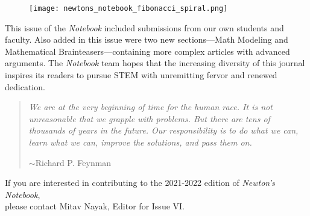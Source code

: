 \documentclass[12pt]{article}
\theoremstyle{definition}
\begin{document}
\newpage



\newpage


\begin{figure}[H]
    \centering
    \vspace*{50pt}
    \texttt{[image: newtons\_notebook\_fibonacci\_spiral.png]}
    \vspace*{25pt}
\end{figure}

    This issue of the \textit{Notebook} included submissions from our own students and faculty. Also added in this issue were two new sections—Math Modeling and Mathematical Brainteasers—containing more complex articles with advanced arguments. The \textit{Notebook} team hopes that the increasing diversity of this journal inspires its readers to pursue STEM with unremitting fervor and renewed dedication. 

\begin{quotation}
\textit{We are at the very beginning of time for the human race. It is not unreasonable that we grapple with problems. But there are tens of thousands of years in the future. Our responsibility is to do what we can, learn what we can, improve the solutions, and pass them on.}
	\begin{flushright}
$\sim$Richard P. Feynman
	\end{flushright}
\end{quotation}

\begin{center}
If you are interested in contributing to the 2021-2022 edition of \textit{Newton’s Notebook},\\ 
please contact Mitav Nayak, Editor for Issue VI.
\end{center}

\end{document}
